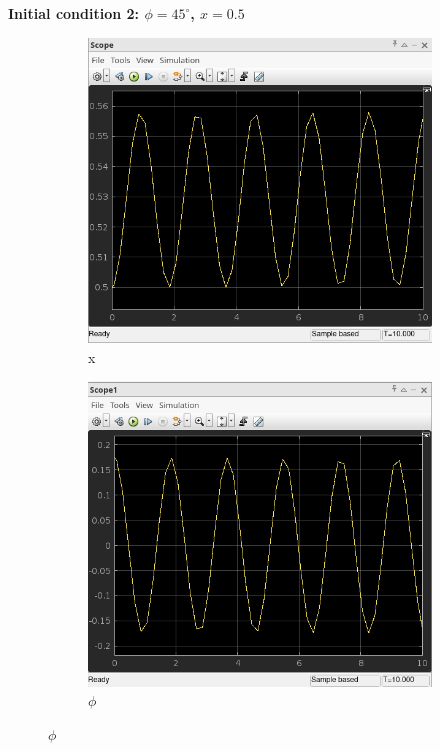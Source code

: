 \documentclass{article}
\begin{document}
\newpage 


\textbf{Initial condition 2: $\phi = 45^\circ$, $x = 0.5$}
\begin{figure}[htbp]
  \centering
  \begin{subfigure}[t]{0.45\linewidth}
    \centering
    \includegraphics[width=\linewidth]{simulink/init1_x.png}
    \caption{x}
  \end{subfigure}
  \begin{subfigure}[t]{0.45\linewidth}
    \centering
    \includegraphics[width=\linewidth]{simulink/init1_phi.png}
    \caption{$\phi$}
  \end{subfigure}
\end{figure}
\end{document}
